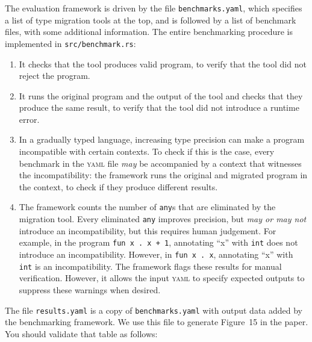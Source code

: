 \documentclass{book}
\begin{document}
The evaluation framework is driven by the file \texttt{benchmarks.yaml},
which specifies a list of type migration tools at the top, and is followed
by a list of benchmark files, with some additional information. The entire
benchmarking procedure is implemented in \texttt{src/benchmark.rs}:
\begin{enumerate}

\item It checks that the tool produces valid program, to verify that the tool
did not reject the program.

\item It runs the original program and the output of the tool and checks that
they produce the same result, to verify that the tool did not introduce a
runtime error.

\item In a gradually typed language, increasing type precision can make a
program incompatible with certain contexts. To check if this is the case, every
benchmark in the \textsc{yaml} file \emph{may} be accompanied by a context that
witnesses the incompatibility: the framework runs the original and migrated
program in the context, to check if they produce different results.

\item The framework counts the number of \texttt{any}s that are eliminated
by the migration tool. Every eliminated \texttt{any} improves precision, but
\emph{may or may not} introduce an incompatibility, but this requires human
judgement. For example, in the
program \verb|fun x . x + 1|, annotating ``x'' with \texttt{int} does not
introduce an incompatibility. However, in \verb|fun x . x|, annotating ``x''
with \texttt{int} is an incompatibility. The framework flags these results
for manual verification. However, it allows the input \textsc{yaml} to specify
expected outputs to suppress these warnings when desired.

\end{enumerate}

The file \texttt{results.yaml} is a copy of \texttt{benchmarks.yaml} with output
data added by the benchmarking framework. We use this file to generate Figure~15
in the paper. You should validate that table as follows:
\end{document}
